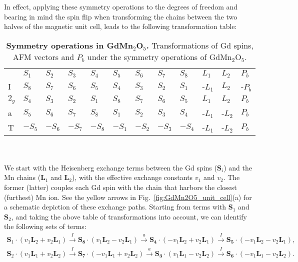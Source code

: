 In effect, applying these symmetry operations to the degrees of freedom and bearing in mind the spin flip when transforming the chains between the two halves of the magnetic unit cell, leads to the following transformation table:
\begin{table}[h]
\centering
\begin{tabular}{|l|lllllllllll|}
\cline{1-12}
 & $S_1$ & $S_2$ & $S_3$ & $S_4$ & $S_5$ & $S_6$ & $S_7$ & $S_8$ & $L_1$ & $L_2$ & $P_b$ \\ \cline{1-12}
I & $S_8$ & $S_7$ & $S_6$ & $S_5$ & $S_4$ & $S_3$ & $S_2$ & $S_1$ & -$L_1$ & $L_2$ & -$P_b$ \\ \cline{1-12}
$2_y$ & $S_4$ & $S_3$ & $S_2$ & $S_1$ & $S_8$ & $S_7$ & $S_6$ & $S_5$ & $L_1$ & $L_2$ & $P_b$ \\ \cline{1-12}
a & $S_5$ & $S_6$ & $S_7$ & $S_8$ & $S_1$ & $S_2$ & $S_3$ & $S_4$ & -$L_1$ & -$L_2$ & $P_b$ \\ \cline{1-12}
T & $-S_5$ & $-S_6$ & $-S_7$ & $-S_8$ & $-S_1$ & $-S_2$ & $-S_3$ & $-S_4$ & -$L_1$ & -$L_2$ & $P_b$ \\ \cline{1-12}
\end{tabular}
\caption{\label{tab:GdMn2O5_symm}{\bf Symmetry operations in GdMn$_2$O$_5$.} Transformations of Gd spins, AFM vectors and $P_b$ under the symmetry operations of GdMn$_2$O$_5$.}
\end{table}\\\\
We start with the Heisenberg exchange terms between the Gd spins ($\bm{S}_i$) and the Mn chains ($\bm{L}_1$ and $\bm{L}_2$), with the effective exchange constants $v_1$ and $v_2$.
The former (latter) couples each Gd spin with the chain that harbors the closest (furthest) Mn ion. See the yellow arrows in Fig.~\ref{fig:GdMn2O5_unit_cell}(a) for a schematic depiction of these exchange paths.
Starting from terms with $\bm{S}_1$ and $\bm{S}_2$, and taking the above table of transformations into account, we can identify the following sets of terms:
\begin{align}
	\bm{S}_1\cdot(v_1 \bm{L}_2 + v_2 \bm{L}_1) \xrightarrow{I} \bm{S_8}\cdot(v_1 \bm{L}_2 - v_2 \bm{L}_1) \xrightarrow{a} \bm{S_4} \cdot (- v_1 \bm{L}_2 + v_2 \bm{L}_1) \xrightarrow{I} \bm{S_5} \cdot (-v_1 \bm{L}_2 - v_2 \bm{L}_1), \nonumber\\
	\bm{S}_2\cdot(v_1 \bm{L}_1 + v_2 \bm{L}_2) \xrightarrow{I} \bm{S_7}\cdot(-v_1 \bm{L}_1 + v_2 \bm{L}_2) \xrightarrow{a} \bm{S_3} \cdot (v_1 \bm{L}_1 - v_2 \bm{L}_2) \xrightarrow{I} \bm{S_6} \cdot (-v_1 \bm{L}_1 - v_2 \bm{L}_2).
\end{align}
